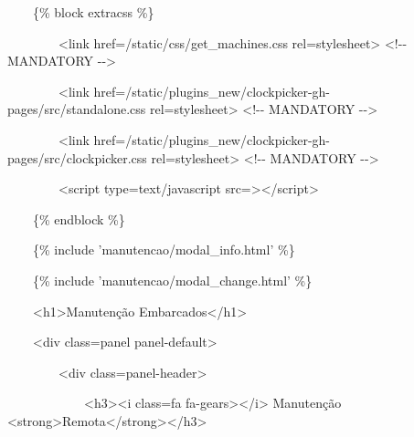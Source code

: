 {\ttfamily\color[rgb]{0.10980392,0.10980392,0.10980392}
    \ \ \ \ \{\% block extracss \%\}}

{\ttfamily\color[rgb]{0.10980392,0.10980392,0.10980392}
    \ \ \ \ \ \ \ \ {\textless}link href={\textquotedbl}/static/css/get\_machines.css{\textquotedbl}
    rel={\textquotedbl}stylesheet{\textquotedbl}{\textgreater} {\textless}!-{}- MANDATORY -{}-{\textgreater}}

{\ttfamily\color[rgb]{0.10980392,0.10980392,0.10980392}
    \ \ \ \ \ \ \ \ {\textless}link
        href={\textquotedbl}/static/plugins\_new/clockpicker-gh-pages/src/standalone.css{\textquotedbl}
    rel={\textquotedbl}stylesheet{\textquotedbl}{\textgreater} {\textless}!-{}- MANDATORY -{}-{\textgreater}}

{\ttfamily\color[rgb]{0.10980392,0.10980392,0.10980392}
    \ \ \ \ \ \ \ \ {\textless}link
        href={\textquotedbl}/static/plugins\_new/clockpicker-gh-pages/src/clockpicker.css{\textquotedbl}
    rel={\textquotedbl}stylesheet{\textquotedbl}{\textgreater} {\textless}!-{}- MANDATORY -{}-{\textgreater}}

{\ttfamily\color[rgb]{0.10980392,0.10980392,0.10980392}
    \ \ \ \ \ \ \ \ {\textless}script type={\textquotedbl}text/javascript{\textquotedbl}
    src={\textquotedbl}{\textquotedbl}{\textgreater}{\textless}/script{\textgreater}}

{\ttfamily\color[rgb]{0.10980392,0.10980392,0.10980392}
    \ \ \ \ \{\% endblock \%\}}

{\ttfamily\color[rgb]{0.10980392,0.10980392,0.10980392}
    \ \ \ \ \{\% include 'manutencao/modal\_info.html' \%\}}

{\ttfamily\color[rgb]{0.10980392,0.10980392,0.10980392}
    \ \ \ \ \{\% include 'manutencao/modal\_change.html' \%\}}

{\ttfamily\color[rgb]{0.10980392,0.10980392,0.10980392}
    \ \ \ \ {\textless}h1{\textgreater}Manuten\c{c}\~ao Embarcados{\textless}/h1{\textgreater} \ \ \ }

{\ttfamily\color[rgb]{0.10980392,0.10980392,0.10980392}
    \ \ \ \ {\textless}div class={\textquotedbl}panel panel-default{\textquotedbl}{\textgreater}}

{\ttfamily\color[rgb]{0.10980392,0.10980392,0.10980392}
    \ \ \ \ \ \ \ \ {\textless}div class={\textquotedbl}panel-header{\textquotedbl}{\textgreater}}

{\ttfamily\color[rgb]{0.10980392,0.10980392,0.10980392}
    \ \ \ \ \ \ \ \ \ \ \ \ {\textless}h3{\textgreater}{\textless}i class={\textquotedbl}fa
        fa-gears{\textquotedbl}{\textgreater}{\textless}/i{\textgreater} Manuten\c{c}\~ao
        {\textless}strong{\textgreater}Remota{\textless}/strong{\textgreater}{\textless}/h3{\textgreater}}

